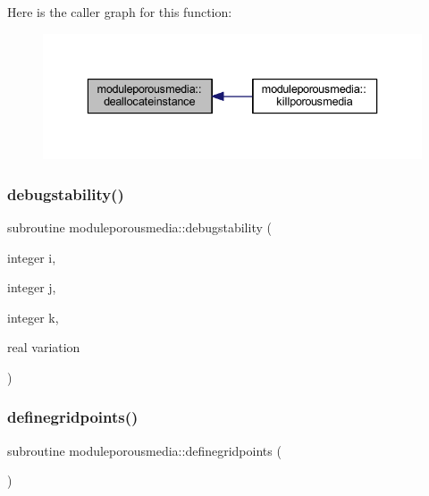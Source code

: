 Here is the caller graph for this function\+:\nopagebreak
\begin{figure}[H]
\begin{center}
\leavevmode
\includegraphics[width=336pt]{namespacemoduleporousmedia_a7941341d1b0822b150125db812b3fc76_icgraph}
\end{center}
\end{figure}
\mbox{\label{namespacemoduleporousmedia_ab71e22750d7cb57370aeec645454d816}} 
\subsubsection{\texorpdfstring{debugstability()}{debugstability()}}
{\footnotesize\ttfamily subroutine moduleporousmedia\+::debugstability (\begin{DoxyParamCaption}\item[{integer}]{i,  }\item[{integer}]{j,  }\item[{integer}]{k,  }\item[{real}]{variation }\end{DoxyParamCaption})\hspace{0.3cm}{\ttfamily [private]}}

\mbox{\label{namespacemoduleporousmedia_a85940000a15a4caa7221748c12a655c6}} 
\subsubsection{\texorpdfstring{definegridpoints()}{definegridpoints()}}
{\footnotesize\ttfamily subroutine moduleporousmedia\+::definegridpoints (\begin{DoxyParamCaption}{ }\end{DoxyParamCaption})\hspace{0.3cm}{\ttfamily [private]}}

